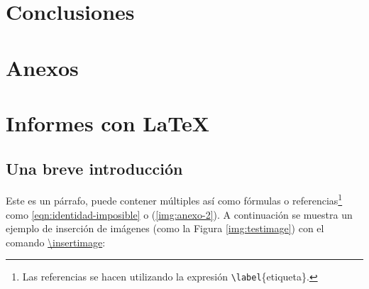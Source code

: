 \section{Conclusiones}

\section{Anexos}


\section{Informes con \LaTeX}

\subsection{Una breve introducción}
	
	Este es un párrafo, puede contener múltiples  así como fórmulas o referencias\footnote{Las referencias se hacen utilizando la expresión \texttt{\textbackslash label}\{etiqueta\}.} como \eqref{eqn:identidad-imposible} o (\ref{img:anexo-2}). A continuación se muestra un ejemplo de inserción de imágenes (como la Figura \ref{img:testimage}) con el comando \href{https://latex.ppizarror.com/informe.html#hlp-imagen}{\textbackslash insertimage}:

